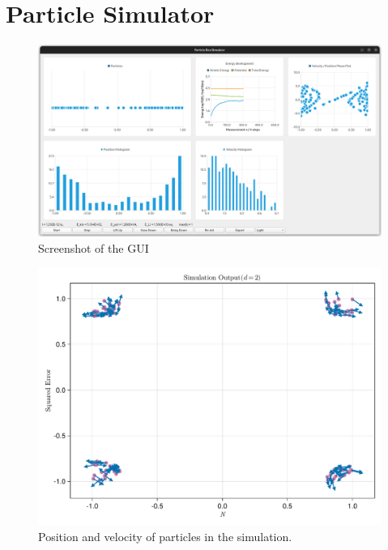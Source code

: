 \chapter{Particle Simulator}
\label{chap:particle-simulator}




\begin{figure}[H]
  \centering
  \label{fig:gui-screenshot}
  \includegraphics[width=\linewidth]{../figures/gui-screenshot.png}
  \caption{Screenshot of the GUI}
\end{figure}

\begin{figure}[H]
  \centering
  \label{fig:simulation-quiver}
  \includegraphics[width=0.8\linewidth]{../figures/results/simulation-quiver.pdf}
  \caption{Position and velocity of particles in the simulation.}
\end{figure}


